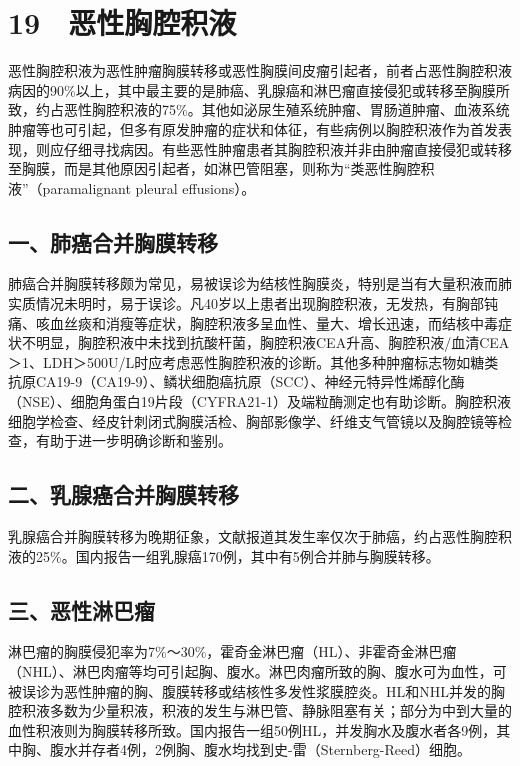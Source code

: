 \protect\hypertarget{text00071.html}{}{}

\section{19　恶性胸腔积液}

恶性胸腔积液为恶性肿瘤胸膜转移或恶性胸膜间皮瘤引起者，前者占恶性胸腔积液病因的90\%以上，其中最主要的是肺癌、乳腺癌和淋巴瘤直接侵犯或转移至胸膜所致，约占恶性胸腔积液的75\%。其他如泌尿生殖系统肿瘤、胃肠道肿瘤、血液系统肿瘤等也可引起，但多有原发肿瘤的症状和体征，有些病例以胸腔积液作为首发表现，则应仔细寻找病因。有些恶性肿瘤患者其胸腔积液并非由肿瘤直接侵犯或转移至胸膜，而是其他原因引起者，如淋巴管阻塞，则称为“类恶性胸腔积液”（paramalignant
pleural effusions）。

\subsection{一、肺癌合并胸膜转移}

肺癌合并胸膜转移颇为常见，易被误诊为结核性胸膜炎，特别是当有大量积液而肺实质情况未明时，易于误诊。凡40岁以上患者出现胸腔积液，无发热，有胸部钝痛、咳血丝痰和消瘦等症状，胸腔积液多呈血性、量大、增长迅速，而结核中毒症状不明显，胸腔积液中未找到抗酸杆菌，胸腔积液CEA升高、胸腔积液/血清CEA＞1、LDH＞500U/L时应考虑恶性胸腔积液的诊断。其他多种肿瘤标志物如糖类抗原CA19-9（CA19-9）、鳞状细胞癌抗原（SCC）、神经元特异性烯醇化酶（NSE）、细胞角蛋白19片段（CYFRA21-1）及端粒酶测定也有助诊断。胸腔积液细胞学检查、经皮针刺闭式胸膜活检、胸部影像学、纤维支气管镜以及胸腔镜等检查，有助于进一步明确诊断和鉴别。

\subsection{二、乳腺癌合并胸膜转移}

乳腺癌合并胸膜转移为晚期征象，文献报道其发生率仅次于肺癌，约占恶性胸腔积液的25\%。国内报告一组乳腺癌170例，其中有5例合并肺与胸膜转移。

\subsection{三、恶性淋巴瘤}

淋巴瘤的胸膜侵犯率为7\%～30\%，霍奇金淋巴瘤（HL）、非霍奇金淋巴瘤（NHL）、淋巴肉瘤等均可引起胸、腹水。淋巴肉瘤所致的胸、腹水可为血性，可被误诊为恶性肿瘤的胸、腹膜转移或结核性多发性浆膜腔炎。HL和NHL并发的胸腔积液多数为少量积液，积液的发生与淋巴管、静脉阻塞有关；部分为中到大量的血性积液则为胸膜转移所致。国内报告一组50例HL，并发胸水及腹水者各9例，其中胸、腹水并存者4例，2例胸、腹水均找到史-雷（Sternberg-Reed）细胞。

